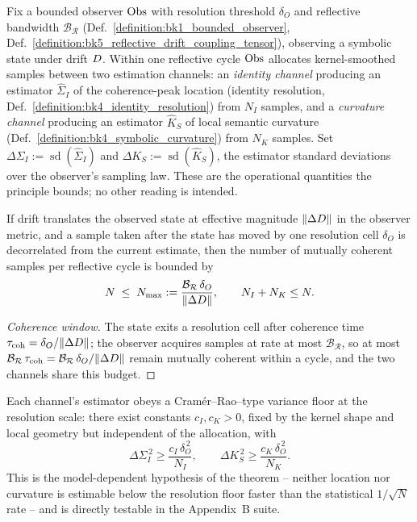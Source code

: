 \begin{definition}
\label{definition:bk7_operational_resolution_uncertainties}
Fix a bounded observer $\mathrm{Obs}$ with resolution threshold $\delta_O$ and reflective bandwidth $\mathcal{B_R}$ (Def.~\ref{definition:bk1_bounded_observer}, Def.~\ref{definition:bk5_reflective_drift_coupling_tensor}), observing a symbolic state under drift $D$. Within one reflective cycle $\mathrm{Obs}$ allocates kernel-smoothed samples between two estimation channels: an \emph{identity channel} producing an estimator $\widehat{\Sigma}_I$ of the coherence-peak location (identity resolution, Def.~\ref{definition:bk4_identity_resolution}) from $N_I$ samples, and a \emph{curvature channel} producing an estimator $\widehat{K}_S$ of local semantic curvature (Def.~\ref{definition:bk4_symbolic_curvature}) from $N_K$ samples. Set $\Delta\Sigma_I := \operatorname{sd}(\widehat{\Sigma}_I)$ and $\Delta K_S := \operatorname{sd}(\widehat{K}_S)$, the estimator standard deviations over the observer's sampling law. These are the operational quantities the principle bounds; no other reading is intended.
\end{definition}

\begin{lemma}
\label{lemma:bk7_coherence_window}
If drift translates the observed state at effective magnitude $\|\Delta D\|$ in the observer metric, and a sample taken after the state has moved by one resolution cell $\delta_O$ is decorrelated from the current estimate, then the number of mutually coherent samples per reflective cycle is bounded by
\[
N \;\le\; N_{\max} := \frac{\mathcal{B_R}\,\delta_O}{\|\Delta D\|}, \qquad N_I + N_K \le N.
\]
\end{lemma}

\begin{proof}[Coherence window]
\label{proof:bk7_coherence_window}
\leavevmode
The state exits a resolution cell after coherence time $\tau_{\mathrm{coh}} = \delta_O / \|\Delta D\|$; the observer acquires samples at rate at most $\mathcal{B_R}$, so at most $\mathcal{B_R}\,\tau_{\mathrm{coh}} = \mathcal{B_R}\,\delta_O / \|\Delta D\|$ remain mutually coherent within a cycle, and the two channels share this budget.
\end{proof}

\begin{assumption}
\label{assumption:bk7_channel_floors}
Each channel's estimator obeys a Cram\'er--Rao--type variance floor at the resolution scale: there exist constants $c_I, c_K > 0$, fixed by the kernel shape and local geometry but independent of the allocation, with
\[
\Delta\Sigma_I^{\,2} \ge \frac{c_I\,\delta_O^{\,2}}{N_I}, \qquad \Delta K_S^{\,2} \ge \frac{c_K\,\delta_O^{\,2}}{N_K}.
\]
This is the model-dependent hypothesis of the theorem -- neither location nor curvature is estimable below the resolution floor faster than the statistical $1/\sqrt{N}$ rate -- and is directly testable in the Appendix~B suite.
\end{assumption}

